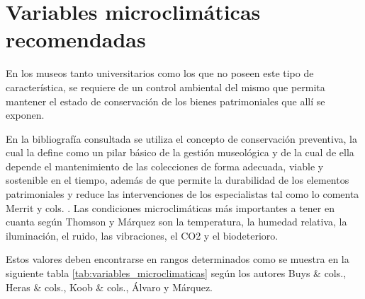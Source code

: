 
    \section{Variables microclimáticas recomendadas}

    En los museos tanto universitarios como los que no poseen este tipo de característica, se requiere de un control ambiental del mismo que permita mantener el estado de conservación de los bienes patrimoniales que allí se exponen.

    En la bibliografía consultada se utiliza el concepto de conservación preventiva, la cual la define \cite{bachmann1992conservation} como un pilar básico de la gestión museológica y de la cual de ella depende el mantenimiento de las colecciones de forma adecuada, viable y sostenible en el tiempo, además de que permite la durabilidad de los elementos patrimoniales y reduce las intervenciones de los especialistas tal como lo comenta Merrit y cols. \cite{merrittPreventiveConservationHistoric2010}. Las condiciones microclimáticas más importantes a tener en cuanta según Thomson \cite{thomsonMuseumEnvironment2018} y Márquez \cite{marquezAgentesDeterioroMedioambientales2016} son la temperatura, la humedad relativa, la iluminación, el ruido, las vibraciones, el CO2 y el biodeterioro.

    Estos valores deben encontrarse en rangos determinados como se muestra en la siguiente tabla \ref{tab:variables_microclimaticas} según los autores Buys \& cols., Heras \& cols., Koob \& cols., Álvaro y Márquez.
    
